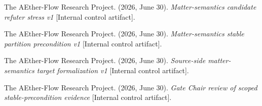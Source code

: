 \documentclass[11pt]{article}
\begin{document}
The AEther-Flow Research Project. (2026, June 30). \emph{Matter-semantics
candidate refuter stress v1} [Internal control artifact].

The AEther-Flow Research Project. (2026, June 30). \emph{Matter-semantics
stable partition precondition v1} [Internal control artifact].

The AEther-Flow Research Project. (2026, June 30). \emph{Source-side
matter-semantics target formalization v1} [Internal control artifact].

The AEther-Flow Research Project. (2026, June 30). \emph{Gate Chair review of
scoped stable-precondition evidence} [Internal control artifact].
\end{document}

